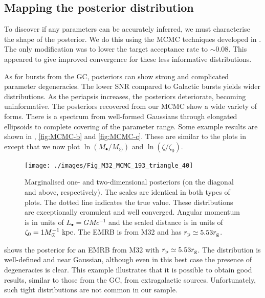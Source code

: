 \subsection{Mapping the posterior distribution}

To discover if any parameters can be accurately inferred, we must characterise the shape of the posterior. We do this using the MCMC techniques developed in . The only modification was to lower the target acceptance rate to $\sim0.08$. This appeared to give improved convergence for these less informative distributions.

As for bursts from the GC, posteriors can show strong and complicated parameter degeneracies. The lower SNR compared to Galactic bursts yields wider distributions. As the periapsis increases, the posteriors deteriorate, becoming uninformative. The posteriors recovered from our MCMC show a wide variety of forms. There is a spectrum from well-formed Gaussians through elongated ellipsoids to complete covering of the parameter range. Some example results are shown in , \ref{fig:MCMC-b} and \ref{fig:MCMC-c}. These are similar to the plots in  except that we now plot $\ln(M_\bullet/M_\odot)$ and $\ln(\zeta/\zeta_0)$.

\begin{figure}%
\centering
\vspace{0.5\baselineskip}
   \texttt{[image: ./images/Fig\_M32\_MCMC\_193\_triangle\_40]}
\caption{Marginalised one- and two-dimensional posteriors (on the diagonal and above, respectively). The scales are identical in both types of plots. The dotted line indicates the true value. These distributions are exceptionally cromulent and well converged. Angular momentum is in units of $L_\bullet = GM c^{-1}$ and the scaled distance is in units of $\zeta_0 = 1 M_\odot^{-1}~\mathrm{kpc}$. The EMRB is from M32 and has $r_\mathrm{p} \simeq 5.53 r_\mathrm{g}$.}
\label{fig:MCMC-a}
\end{figure}
 shows the posterior for an EMRB from M32 with $r_\mathrm{p} \simeq 5.53 r_\mathrm{g}$. The distribution is well-defined and near Gaussian, although even in this best case the presence of degeneracies is clear. This example illustrates that it is possible to obtain good results, similar to those from the GC, from extragalactic sources. Unfortunately, such tight distributions are not common in our sample.

